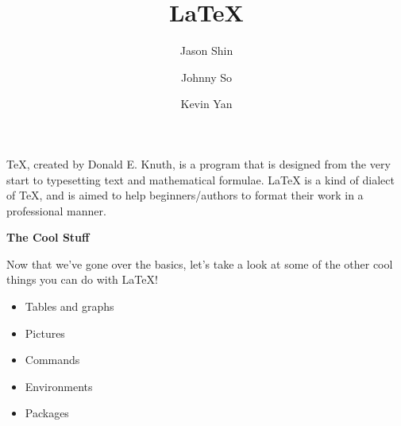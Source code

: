 \documentclass[a4paper,12pt]{article}
\title{LaTeX}
\author{Jason Shin \and Johnny So \and Kevin Yan}
\begin{document}
\maketitle
\newpage
TeX, created by Donald E. Knuth, is a program that is designed from the very
start to typesetting text and mathematical formulae. LaTeX is a kind of dialect
of TeX, and is aimed to help beginners/authors to format their work in a 
professional manner.

\newpage
\begin{center}
	\bf{\Huge{The Cool Stuff}}
\end{center}
\bigskip 
\Large
Now that we've gone over the basics, let's take a look at some of the other cool things you can do with LaTeX! 
\begin{itemize}
	\item Tables and graphs
	\item Pictures
	\item Commands
	\item Environments
	\item Packages
\end{itemize}
\end{document}
